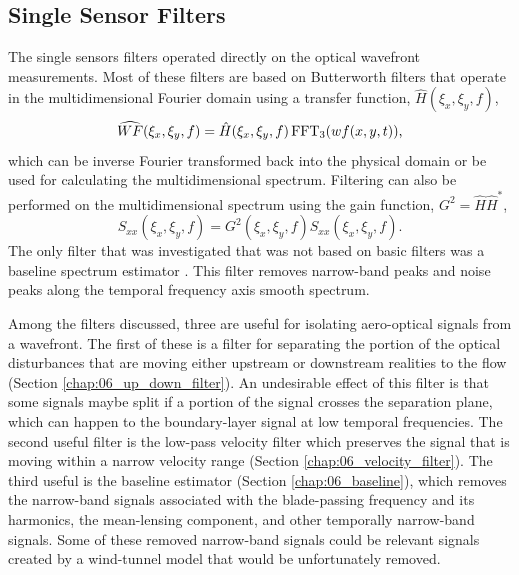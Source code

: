 \subsection{Single Sensor Filters}
The single sensors filters operated directly on the optical wavefront measurements.
Most of these filters are based on Butterworth filters \cite{Butterworth-1930-DvDrjKha} that operate in the multidimensional Fourier domain using a transfer function, $\hat{H}(\xi_x,\xi_y,f)$,
\begin{equation}
  \widehat{WF}(\xi_x,\xi_y,f) = \hat{H}(\xi_x,\xi_y,f)\operatorname{FFT_3}(wf(x,y,t)) \textrm{,}
\end{equation}
which can be inverse Fourier transformed back into the physical domain or be used for calculating the multidimensional spectrum.
Filtering can also be performed on the multidimensional spectrum using the gain function, $G^2 = \hat{H}\hat{H}^*$,
\begin{equation}
  S_{xx}(\xi_x,\xi_y,f) = G^2(\xi_x,\xi_y,f)S_{xx}(\xi_x,\xi_y,f) \textrm{.}
\end{equation}
The only filter that was investigated that was not based on basic filters was a baseline spectrum estimator \cite{Schulze-2012-GmyAqzC7}.
This filter removes narrow-band peaks and noise peaks along the temporal frequency axis smooth spectrum.

Among the filters discussed, three are useful for isolating aero-optical signals from a wavefront.
The first of these is a filter for separating the portion of the optical disturbances that are moving either upstream or downstream realities to the flow (Section  \ref{chap:06_up_down_filter}).
An undesirable effect of this filter is that some signals maybe split if a portion of the signal crosses the separation plane, which can happen to the boundary-layer signal at low temporal frequencies.
The second useful filter is the low-pass velocity filter which preserves the signal that is moving within a narrow velocity range (Section \ref{chap:06_velocity_filter}).
The third useful is the baseline estimator (Section \ref{chap:06_baseline}), which removes the narrow-band signals associated with the blade-passing frequency and its harmonics, the mean-lensing component, and other temporally narrow-band signals.
Some of these removed narrow-band signals could be relevant signals created by a wind-tunnel model that would be unfortunately removed.

